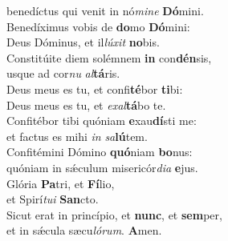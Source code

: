 \evenverse benedíctus qui venit in nó\textit{mi}\textit{ne} \textbf{Dó}mini.\\
\oddverse Benedíximus vobis de \textbf{do}mo \textbf{Dó}mini:~\*\\
\oddverse Deus Dóminus, et il\textit{lú}\textit{xit} \textbf{no}bis.\\
\evenverse Constitúite diem solémnem \textbf{in} con\textbf{dén}sis,~\*\\
\evenverse usque ad cor\textit{nu} \textit{al}\textbf{tá}ris.\\
\oddverse Deus meus es tu, et confi\textbf{té}bor \textbf{ti}bi:~\*\\
\oddverse Deus meus es tu, et \textit{e}\textit{xal}\textbf{tá}bo te.\\
\evenverse Confitébor tibi quóniam \textbf{e}xau\textbf{dí}sti me:~\*\\
\evenverse et factus es mihi \textit{in} \textit{sa}\textbf{lú}tem.\\
\oddverse Confitémini Dómino \textbf{quó}niam \textbf{bo}nus:~\*\\
\oddverse quóniam in sǽculum misericór\textit{di}\textit{a} \textbf{e}jus.\\
\evenverse Glória \textbf{Pa}tri, et \textbf{Fí}lio,~\*\\
\evenverse et Spirí\textit{tu}\textit{i} \textbf{San}cto.\\
\oddverse Sicut erat in princípio, et \textbf{nunc}, et \textbf{sem}per,~\*\\
\oddverse et in sǽcula sæcu\textit{ló}\textit{rum}. \textbf{A}men.\\
